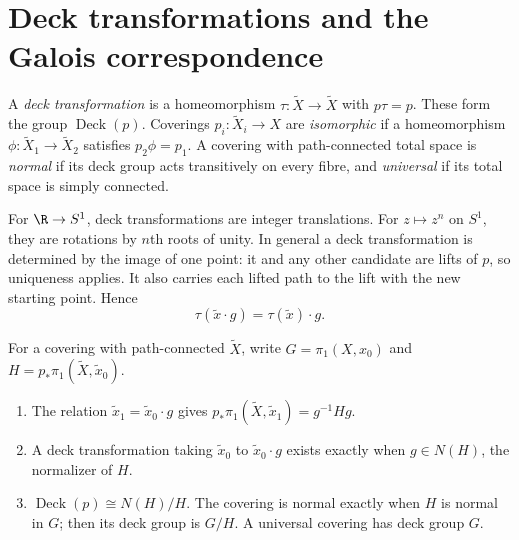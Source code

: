 \section{Deck transformations and the Galois correspondence}

\begin{definition}
A \emph{deck transformation} is a homeomorphism $\tau:\tilde X\to\tilde X$ with $p\tau=p$. These form the group $\operatorname{Deck}(p)$. Coverings $p_i:\tilde X_i\to X$ are \emph{isomorphic} if a homeomorphism $\phi:\tilde X_1\to\tilde X_2$ satisfies $p_2\phi=p_1$. A covering with path-connected total space is \emph{normal} if its deck group acts transitively on every fibre, and \emph{universal} if its total space is simply connected.
\end{definition}

For $\R\to S^1$, deck transformations are integer translations. For $z\mapsto z^n$ on $S^1$, they are rotations by $n$th roots of unity. In general a deck transformation is determined by the image of one point: it and any other candidate are lifts of $p$, so uniqueness applies. It also carries each lifted path to the lift with the new starting point. Hence
\[
\tau(\tilde x\cdot g)=\tau(\tilde x)\cdot g.
\]

\begin{theorem}\label{thm:deck}
For a covering with path-connected $\tilde X$, write $G=\pi_1(X,x_0)$ and $H=p_*\pi_1(\tilde X,\tilde x_0)$.
\begin{enumerate}
\item[(a)] The relation $\tilde x_1=\tilde x_0\cdot g$ gives $p_*\pi_1(\tilde X,\tilde x_1)=g^{-1}Hg$.
\item[(b)] A deck transformation taking $\tilde x_0$ to $\tilde x_0\cdot g$ exists exactly when $g\in N(H)$, the normalizer of $H$.
\item[(c)] $\operatorname{Deck}(p)\cong N(H)/H$. The covering is normal exactly when $H$ is normal in $G$; then its deck group is $G/H$. A universal covering has deck group $G$.
\end{enumerate}
\end{theorem}

